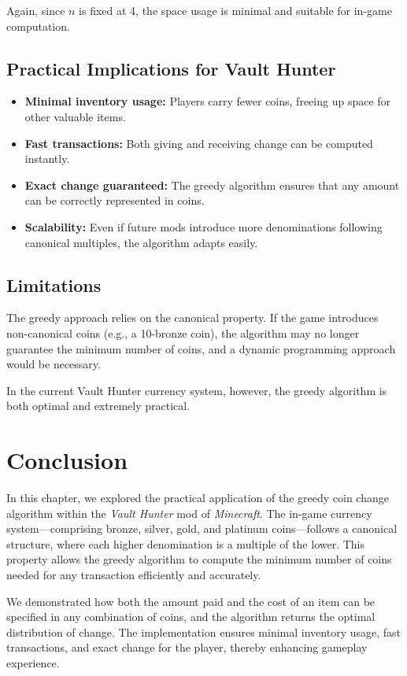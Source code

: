 \documentclass[12pt,a4paper]{report}
\begin{document}
Again, since $n$ is fixed at 4, the space usage is minimal and suitable for in-game computation.

\subsection{Practical Implications for Vault Hunter}

\begin{itemize}
    \item \textbf{Minimal inventory usage:} Players carry fewer coins, freeing up space for other valuable items.
    \item \textbf{Fast transactions:} Both giving and receiving change can be computed instantly.
    \item \textbf{Exact change guaranteed:} The greedy algorithm ensures that any amount can be correctly represented in coins.
    \item \textbf{Scalability:} Even if future mods introduce more denominations following canonical multiples, the algorithm adapts easily.
\end{itemize}

\subsection{Limitations}

The greedy approach relies on the canonical property. If the game introduces non-canonical coins (e.g., a 10-bronze coin), the algorithm may no longer guarantee the minimum number of coins, and a dynamic programming approach would be necessary.

\noindent In the current Vault Hunter currency system, however, the greedy algorithm is both optimal and extremely practical.

\section{Conclusion}

In this chapter, we explored the practical application of the greedy coin change algorithm within the \textit{Vault Hunter} mod of \textit{Minecraft}. The in-game currency system—comprising bronze, silver, gold, and platinum coins—follows a canonical structure, where each higher denomination is a multiple of the lower. This property allows the greedy algorithm to compute the minimum number of coins needed for any transaction efficiently and accurately.

We demonstrated how both the amount paid and the cost of an item can be specified in any combination of coins, and the algorithm returns the optimal distribution of change. The implementation ensures minimal inventory usage, fast transactions, and exact change for the player, thereby enhancing gameplay experience.
\end{document}
